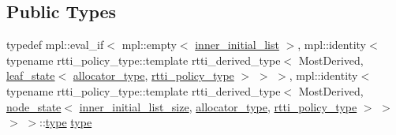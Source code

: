 \subsection*{Public Types}
\begin{DoxyCompactItemize}
\item 
typedef mpl\+::eval\+\_\+if$<$ mpl\+::empty$<$ \mbox{\hyperlink{structboost_1_1statechart_1_1detail_1_1simple__state__base__type_aac74557aa49951c88f68f5b66470b679}{inner\+\_\+initial\+\_\+list}} $>$, mpl\+::identity$<$ typename rtti\+\_\+policy\+\_\+type\+::template rtti\+\_\+derived\+\_\+type$<$ Most\+Derived, \mbox{\hyperlink{classboost_1_1statechart_1_1detail_1_1leaf__state}{leaf\+\_\+state}}$<$ \mbox{\hyperlink{structboost_1_1statechart_1_1detail_1_1simple__state__base__type_a435aafee614e28d33bab92dffc2e879b}{allocator\+\_\+type}}, \mbox{\hyperlink{structboost_1_1statechart_1_1detail_1_1simple__state__base__type_a6a41400b974abd80bbd4c10ed753745b}{rtti\+\_\+policy\+\_\+type}} $>$ $>$ $>$, mpl\+::identity$<$ typename rtti\+\_\+policy\+\_\+type\+::template rtti\+\_\+derived\+\_\+type$<$ Most\+Derived, \mbox{\hyperlink{classboost_1_1statechart_1_1detail_1_1node__state}{node\+\_\+state}}$<$ \mbox{\hyperlink{structboost_1_1statechart_1_1detail_1_1simple__state__base__type_a575dd67321ac3022634df1f716a93131}{inner\+\_\+initial\+\_\+list\+\_\+size}}, \mbox{\hyperlink{structboost_1_1statechart_1_1detail_1_1simple__state__base__type_a435aafee614e28d33bab92dffc2e879b}{allocator\+\_\+type}}, \mbox{\hyperlink{structboost_1_1statechart_1_1detail_1_1simple__state__base__type_a6a41400b974abd80bbd4c10ed753745b}{rtti\+\_\+policy\+\_\+type}} $>$ $>$ $>$ $>$\+::\mbox{\hyperlink{structboost_1_1statechart_1_1detail_1_1simple__state__base__type_af90a0a8f976dd22839145952facf37b7}{type}} \mbox{\hyperlink{structboost_1_1statechart_1_1detail_1_1simple__state__base__type_af90a0a8f976dd22839145952facf37b7}{type}}
\end{DoxyCompactItemize}

